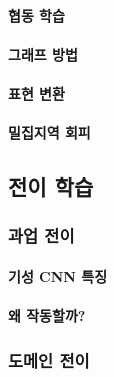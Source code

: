 \documentclass [12pt] {oblivoir}
\let\oldsubsubsection=\subsubsection
\renewcommand{\subsubsection}
{
  \filbreak
  \oldsubsubsection
}
\begin{document}
\vspace{3mm}

\paragraph*{협동 학습}\mbox{}

\vspace{3mm}

\paragraph*{그래프 방법}\mbox{}

\vspace{3mm}

\paragraph*{표현 변환}\mbox{}

\vspace{3mm}

\paragraph*{밀집지역 회피}\mbox{}

\vspace{3mm}

\subsection{전이 학습}

\subsubsection{과업 전이}

\paragraph*{기성 CNN 특징}\mbox{}

\vspace{3mm}

\paragraph*{왜 작동할까?}\mbox{}

\vspace{3mm}

\subsubsection{도메인 전이}
\end{document}
